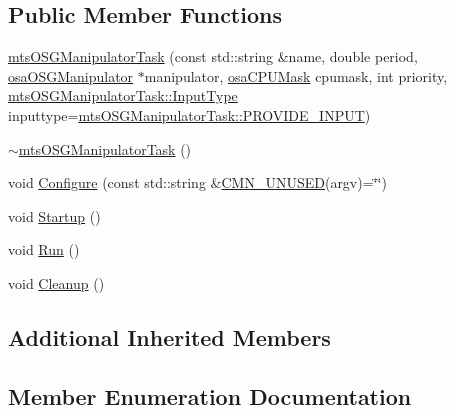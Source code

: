 \subsection*{Public Member Functions}
\begin{DoxyCompactItemize}
\item 
\hyperlink{classmts_o_s_g_manipulator_task_a88e93504aaff6f88fba8cd17ceb328ca}{mts\+O\+S\+G\+Manipulator\+Task} (const std\+::string \&name, double period, \hyperlink{classosa_o_s_g_manipulator}{osa\+O\+S\+G\+Manipulator} $\ast$manipulator, \hyperlink{osa_c_p_u_affinity_8h_aaec7cdd7797e5e6eb5438c15fee5477a}{osa\+C\+P\+U\+Mask} cpumask, int priority, \hyperlink{classmts_o_s_g_manipulator_task_a176aa50980ddf34d1150514bb620cb8f}{mts\+O\+S\+G\+Manipulator\+Task\+::\+Input\+Type} inputtype=\hyperlink{classmts_o_s_g_manipulator_task_a176aa50980ddf34d1150514bb620cb8fa73f760c3f4b883d0ce1a241d172e626a}{mts\+O\+S\+G\+Manipulator\+Task\+::\+P\+R\+O\+V\+I\+D\+E\+\_\+\+I\+N\+P\+U\+T})
\item 
\hyperlink{classmts_o_s_g_manipulator_task_ad752b96d61680cc033e02d574fae52ab}{$\sim$mts\+O\+S\+G\+Manipulator\+Task} ()
\item 
void \hyperlink{classmts_o_s_g_manipulator_task_a0d1824dee2f6f86e17b10dcc98bfbe40}{Configure} (const std\+::string \&\hyperlink{cmn_portability_8h_a021894e2626935fa2305434b1e893ff6}{C\+M\+N\+\_\+\+U\+N\+U\+S\+E\+D}(argv)=\char`\"{}\char`\"{})
\item 
void \hyperlink{classmts_o_s_g_manipulator_task_a1cda4027909f2ec39729af5558b34e6e}{Startup} ()
\item 
void \hyperlink{classmts_o_s_g_manipulator_task_a7cf39031d1894ae1b320410d51703213}{Run} ()
\item 
void \hyperlink{classmts_o_s_g_manipulator_task_ac90dcaf4af30c82a4f3043a2f0e152cb}{Cleanup} ()
\end{DoxyCompactItemize}
\subsection*{Additional Inherited Members}


\subsection{Member Enumeration Documentation}
\hypertarget{classmts_o_s_g_manipulator_task_a176aa50980ddf34d1150514bb620cb8f}{}
